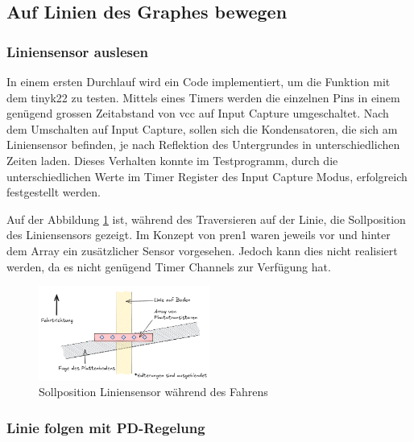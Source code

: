 
\subsection{Auf Linien des Graphes bewegen}
\label{Auf Linien des Graphes bewegen}

\subsubsection{Liniensensor auslesen}
\label{Liniensensor auslesen}

In einem ersten Durchlauf wird ein Code implementiert, um die Funktion mit dem \gls{tinyk22} zu testen. Mittels eines Timers werden die einzelnen Pins in einem genügend grossen Zeitabstand von \acrfull{vcc} auf Input Capture umgeschaltet. Nach dem Umschalten auf Input Capture, sollen sich die Kondensatoren, die sich am Liniensensor befinden, je nach Reflektion des Untergrundes in unterschiedlichen Zeiten laden. Dieses Verhalten konnte im Testprogramm, durch die unterschiedlichen Werte im Timer Register des Input Capture Modus, erfolgreich festgestellt werden.

Auf der Abbildung \ref{fig:liniensensor soll} ist, während des Traversieren auf der Linie, die Sollposition des Liniensensors gezeigt. Im Konzept von \acrshort{pren1} waren jeweils vor und hinter dem Array ein zusätzlicher Sensor vorgesehen. Jedoch kann dies nicht realisiert werden, da es nicht genügend Timer Channels zur Verfügung hat.

 \begin{figure}[H]
\centering
\includegraphics[width=0.5\textwidth ]{assets/ET/Liniensensor/linesensor.png}
\caption{Sollposition Liniensensor während des Fahrens}
\label{fig:liniensensor soll}
\end{figure}


\subsubsection{Linie folgen mit PD-Regelung}
\label{Linie folgen mit PD-Regelung}

